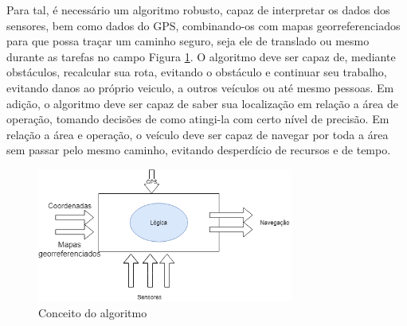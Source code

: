 Para tal, é necessário um algoritmo robusto, capaz de interpretar os dados dos sensores, bem como dados do GPS, combinando-os com mapas georreferenciados para que possa traçar um caminho seguro, seja ele de translado ou mesmo durante as tarefas no campo Figura \ref{fig:entrada:saida}. O algoritmo deve ser capaz de, mediante obstáculos, recalcular sua rota, evitando o obstáculo e continuar seu trabalho, evitando danos ao próprio veiculo, a outros veículos ou até mesmo pessoas. Em adição, o algoritmo deve ser capaz de saber sua localização em relação a área de operação, tomando decisões de como atingi-la com certo nível de precisão. Em relação a área e operação, o veículo deve ser capaz de navegar por toda a área sem passar pelo mesmo caminho, evitando desperdício de recursos e de tempo.

\begin{figure}[H]
    \centering
    \includegraphics[width=0.75\textwidth]{figuras/entradaSaida.png}
    \caption{Conceito do algoritmo}
    \label{fig:entrada:saida}
\end{figure}

